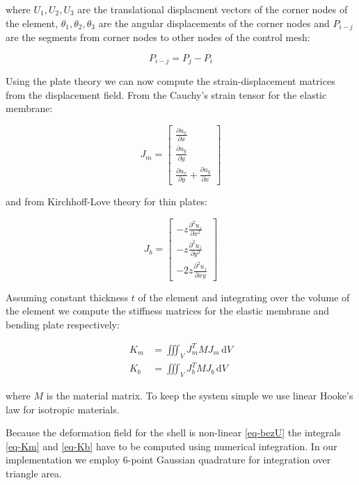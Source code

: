 \documentclass{egpubl}
\newcommand{\deriv}[2]{\frac{\partial #1}{\partial #2}}
\begin{document}
where $U_1, U_2, U_3$ are the translational displacment vectors of the
corner nodes of the element, $\theta_1, \theta_2, \theta_3$ are the angular
displacements of the corner nodes and $P_{i-j}$ are the segments from
corner nodes to other nodes of the control mesh:

\begin{equation}
    P_{i-j} = P_j-P_i %
\end{equation}

Using the plate theory we can now compute the strain-displacement matrices
from the displacement field. From the Cauchy's strain tensor for the
elastic membrane:

\begin{equation}\label{eq-cauchy}
    J_m = \left[ \begin{matrix}
        \deriv{u_x}{x} \\
        \deriv{u_y}{y} \\
        \deriv{u_x}{y} + \deriv{u_y}{x}
    \end{matrix} \right]
\end{equation}

and from Kirchhoff-Love theory for thin plates:

\begin{equation}\label{eq-kirchhoff}
    J_b = \left[ \begin{matrix}
        - z \deriv{^2 u_z}{x^2} \\
        - z \deriv{^2 u_z}{y^2} \\
        - 2z \deriv{^2 u_z}{xy}
    \end{matrix} \right]
\end{equation}

Assuming constant thickness $t$ of the element and integrating over the volume
of the element we compute the stiffness matrices for the elastic membrane
and bending plate respectively:

\begin{align}
    \label{eq-Km}
    K_m & = \iiint_V J_m^T M J_m \, \mathrm{d} V \\
    \label{eq-Kb}
    K_b & = \iiint_V J_b^T M J_b \, \mathrm{d} V
\end{align}

where $M$ is the material matrix. To keep the system simple we use linear
Hooke's law for isotropic materials.

Because the deformation field for the shell is non-linear \eqref{eq-bezU}
the integrals \eqref{eq-Km} and \eqref{eq-Kb} have to be computed using
numerical integration. In our implementation we employ 6-point Gaussian
quadrature for integration over triangle area.
\end{document}
